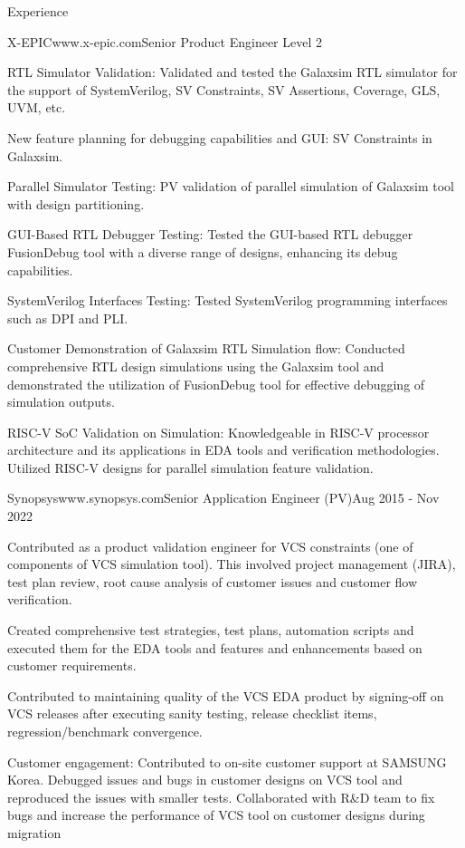 \documentclass[
11pt, %
]{./assets/resume} %
\begin{document}
\begin{rSection}{Experience}
	\begin{rSubsectionX}{X-EPIC}{www.x-epic.com}{Senior Product Engineer Level 2}
		\item RTL Simulator Validation: Validated and tested the Galaxsim RTL simulator for the support of SystemVerilog, SV Constraints, SV Assertions, Coverage, GLS, UVM, etc.
		\item New feature planning for debugging capabilities and GUI: SV Constraints in Galaxsim.
		\item Parallel Simulator Testing: PV validation of parallel simulation of Galaxsim tool with design partitioning.
		\item GUI-Based RTL Debugger Testing: Tested the GUI-based RTL debugger FusionDebug tool with a diverse range of designs, enhancing its debug capabilities.
		\item SystemVerilog Interfaces Testing: Tested SystemVerilog programming interfaces such as DPI and PLI. 
		\item Customer Demonstration of Galaxsim RTL Simulation flow: Conducted comprehensive RTL design simulations using the Galaxsim tool and demonstrated the utilization of FusionDebug tool for effective debugging of simulation outputs.
		\item RISC-V SoC Validation on Simulation: Knowledgeable in RISC-V processor architecture and its applications in EDA tools and verification methodologies. Utilized RISC-V designs for parallel simulation feature validation.
	\end{rSubsectionX}
	\begin{rSubsectionX}{Synopsys}{www.synopsys.com}{Senior Application Engineer (PV)}{Aug 2015 - Nov 2022}
		\item Contributed as a product validation engineer for VCS constraints (one of components of VCS simulation tool). This involved project management (JIRA), test plan review, root cause analysis of customer issues and customer flow verification.
		\item Created comprehensive test strategies, test plans, automation scripts and executed them for the EDA tools and features and enhancements based on customer requirements.
		\item Contributed to maintaining quality of the VCS EDA product by signing-off on VCS releases after executing sanity testing, release checklist items, regression/benchmark convergence.
		\item Customer engagement: Contributed to on-site customer support at SAMSUNG Korea. Debugged issues and bugs in customer designs on VCS tool and reproduced the issues with smaller tests. Collaborated with R\&D team to fix bugs and increase the performance of VCS tool on customer designs during migration

\end{rSubsectionX}
\end{rSection}
\end{document}
